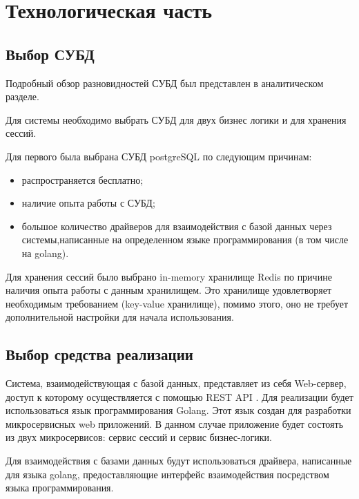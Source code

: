\chapter{Технологическая часть}
%

\section{Выбор СУБД}
Подробный обзор разновидностей СУБД был представлен в аналитическом разделе.

Для системы необходимо выбрать СУБД для двух бизнес логики и для хранения сессий.

Для первого была выбрана СУБД postgreSQL по следующим причинам:
\begin{itemize}
\item распространяется бесплатно;
\item наличие опыта работы с СУБД;
\item большое количество драйверов для взаимодействия с базой данных через системы,написанные на определенном языке программирования (в том числе на golang). 
\end{itemize}

Для хранения сессий было выбрано in-memory хранилище Redis по причине наличия опыта работы с данным хранилищем. Это хранилище удовлетворяет необходимым требованием (key-value хранилище), помимо этого, оно не требует дополнительной настройки для начала использования.  

\section{Выбор средства реализации}
Система, взаимодействующая с базой данных, представляет из себя Web-сервер, доступ к которому осуществляется с помощью REST API \cite{rest-api}.  
Для реализации будет использоваться язык программирования Golang\cite{golang}. Этот язык 
создан для разработки микросервисных web приложений. 
В данном случае приложение будет состоять из двух микросервисов: сервис сессий и сервис бизнес-логики. 

Для взаимодействия с базами данных будут использоваться драйвера, написанные для языка golang, предоставляющие интерфейс взаимодействия посредством языка программирования.  


